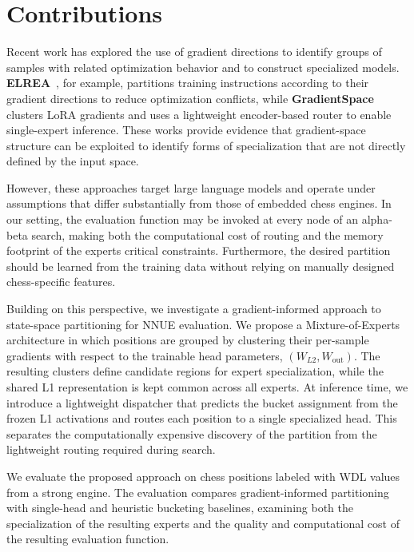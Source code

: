 \section{Contributions}\label{sec:contributions}

Recent work has explored the use of gradient directions to identify groups of samples with related optimization behavior and to construct specialized models. \textbf{ELREA}~\cite{li2025elrea}, for example, partitions training instructions according to their gradient directions to reduce optimization conflicts, while \textbf{GradientSpace}~\cite{sridharan2025gradientspace} clusters LoRA gradients and uses a lightweight encoder-based router to enable single-expert inference. These works provide evidence that gradient-space structure can be exploited to identify forms of specialization that are not directly defined by the input space.

However, these approaches target large language models and operate under assumptions that differ substantially from those of embedded chess engines. In our setting, the evaluation function may be invoked at every node of an alpha-beta search, making both the computational cost of routing and the memory footprint of the experts critical constraints. Furthermore, the desired partition should be learned from the training data without relying on manually designed chess-specific features.

Building on this perspective, we investigate a gradient-informed approach to state-space partitioning for NNUE evaluation. We propose a Mixture-of-Experts architecture in which positions are grouped by clustering their per-sample gradients with respect to the trainable head parameters, \((W_{L2}, W_{\mathrm{out}})\). The resulting clusters define candidate regions for expert specialization, while the shared L1 representation is kept common across all experts. At inference time, we introduce a lightweight dispatcher that predicts the bucket assignment from the frozen L1 activations and routes each position to a single specialized head. This separates the computationally expensive discovery of the partition from the lightweight routing required during search.

We evaluate the proposed approach on chess positions labeled with WDL values from a strong engine. The evaluation compares gradient-informed partitioning with single-head and heuristic bucketing baselines, examining both the specialization of the resulting experts and the quality and computational cost of the resulting evaluation function.

